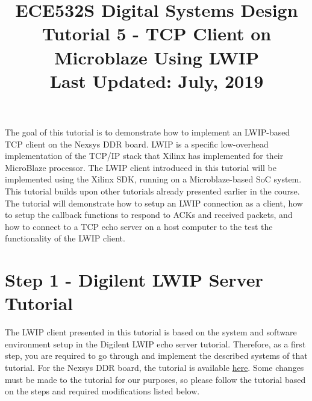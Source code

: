 \documentclass[11pt]{article}
\title{ECE532S Digital Systems Design \\ \vspace{0.4cm}
       \Large Tutorial 5 - TCP Client on Microblaze Using LWIP \\ \vspace{0.4cm}
       \small Last Updated: July, 2019}
\author{ }
\date{ }
\begin{document}
\maketitle
\vspace{-1cm}

The goal of this tutorial is to demonstrate how to implement an LWIP-based TCP client on the Nexsys DDR board. LWIP is a specific low-overhead implementation of the TCP/IP stack that Xilinx has implemented for their MicroBlaze processor. The LWIP client introduced in this tutorial will be implemented using the Xilinx SDK, running on a Microblaze-based SoC system. This tutorial builds upon other tutorials already presented earlier in the course. The tutorial will demonstrate how to setup an LWIP connection as a client, how to setup the callback functions to respond to ACKs and received packets, and how to connect to a TCP echo server on a host computer to the test the functionality of the LWIP client.

\section*{Step 1 - Digilent LWIP Server Tutorial}
The LWIP client presented in this tutorial is based on the system and software environment setup in the Digilent LWIP echo server tutorial. Therefore, as a first step, you are required to go through and implement the described systems of that tutorial. For the Nexsys DDR board, the tutorial is available \href{https://reference.digilentinc.com/learn/programmable-logic/tutorials/nexys-4-ddr-getting-started-with-microblaze-servers/start}{\color{blue}here}. Some changes must be made to the tutorial for our purposes, so please follow the tutorial based on the steps and required modifications listed below.
\end{document}
